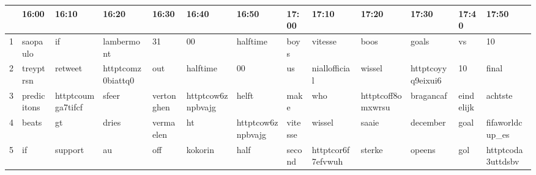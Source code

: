 \begin{table}[ht]
\centering
\begin{tabular}{rllllllllllll}
  \hline
 & 16:00 & 16:10 & 16:20 & 16:30 & 16:40 & 16:50 & 17:00 & 17:10 & 17:20 & 17:30 & 17:40 & 17:50 \\ 
  \hline
1 & saopaulo & if & lambermont & 31 & 00 & halftime & boys & vitesse & boos & goals & vs & 10 \\ 
  2 & treyptrsn & retweet & httptcomz0biattq0 & out & halftime & 00 & us & niallofficial & wissel & httptcoyyq9eixui6 & 10 & final \\ 
  3 & predicitons & httptcoumga7tifcf & sfeer & vertonghen & httptcow6znpbvajg & helft & make & who & httptcoff8omxwrsu & bragancaf & eindelijk & achtste \\ 
  4 & beats & gt & dries & vermaelen & ht & httptcow6znpbvajg & vitesse & wissel & saaie & december & goal & fifaworldcup\_es \\ 
  5 & if & support & au & off & kokorin & half & second & httptcor6f7efvwuh & sterke & opeens & gol & httptcoda3uttdsbv \\ 
   \hline
\end{tabular}
\end{table}
